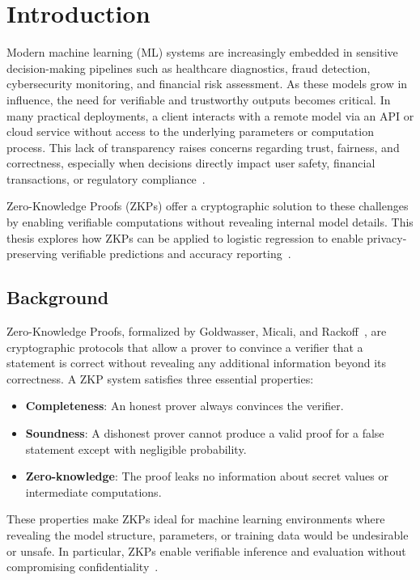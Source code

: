 \chapter{Introduction}

Modern machine learning (ML) systems are increasingly embedded in sensitive decision-making pipelines such as healthcare diagnostics, fraud detection, cybersecurity monitoring, and financial risk assessment. As these models grow in influence, the need for verifiable and trustworthy outputs becomes critical. In many practical deployments, a client interacts with a remote model via an API or cloud service without access to the underlying parameters or computation process. This lack of transparency raises concerns regarding trust, fairness, and correctness, especially when decisions directly impact user safety, financial transactions, or regulatory compliance~\cite{lavin2024surveyapplicationszeroknowledgeproofs}.

Zero-Knowledge Proofs (ZKPs) offer a cryptographic solution to these challenges by enabling verifiable computations without revealing internal model details. This thesis explores how ZKPs can be applied to logistic regression to enable privacy-preserving verifiable predictions and accuracy reporting~\cite{cryptoeprint:2025/507}.

\section{Background}

Zero-Knowledge Proofs, formalized by Goldwasser, Micali, and Rackoff~\cite{goldwasser1989knowledge}, are cryptographic protocols that allow a prover to convince a verifier that a statement is correct without revealing any additional information beyond its correctness. A ZKP system satisfies three essential properties:
\begin{itemize}
    \item \textbf{Completeness}: An honest prover always convinces the verifier.
    \item \textbf{Soundness}: A dishonest prover cannot produce a valid proof for a false statement except with negligible probability.
    \item \textbf{Zero-knowledge}: The proof leaks no information about secret values or intermediate computations.
\end{itemize}

These properties make ZKPs ideal for machine learning environments where revealing the model structure, parameters, or training data would be undesirable or unsafe. In particular, ZKPs enable verifiable inference and evaluation without compromising confidentiality~\cite{cryptoeprint:2023/1345}.

